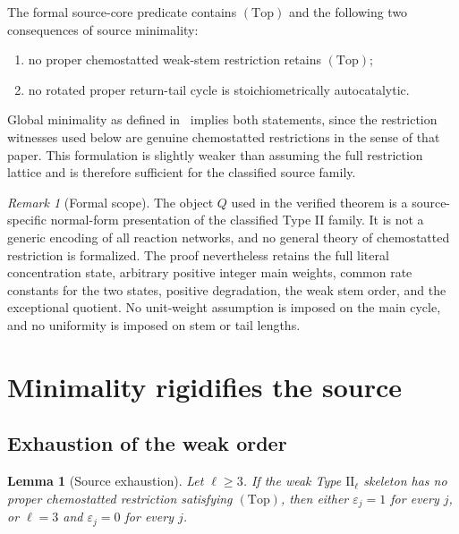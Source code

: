 \documentclass[11pt,reqno]{amsart}
\theoremstyle{plain}
\newtheorem{lemma}[theorem]{Lemma}
\theoremstyle{definition}
\theoremstyle{remark}
\newtheorem{remark}[theorem]{Remark}
\numberwithin{equation}{section}
\newcommand{\Top}{\mathrm{(Top)}}
\begin{document}
The formal source-core predicate contains $\Top$ and the following two consequences of source minimality:
\begin{enumerate}[label=(M\arabic*)]
\item\label{M1} no proper chemostatted weak-stem restriction retains $\Top$;
\item\label{M2} no rotated proper return-tail cycle is stoichiometrically autocatalytic.
\end{enumerate}
Global minimality as defined in~\cite[Definitions~2.3--2.4]{NNU26} implies both statements, since the restriction witnesses used below are genuine chemostatted restrictions in the sense of that paper.  This formulation is slightly weaker than assuming the full restriction lattice and is therefore sufficient for the classified source family.

\begin{remark}[Formal scope]\label{rem:scope}
The object $Q$ used in the verified theorem is a source-specific normal-form presentation of the classified Type II family.  It is not a generic encoding of all reaction networks, and no general theory of chemostatted restriction is formalized.  The proof nevertheless retains the full literal concentration state, arbitrary positive integer main weights, common rate constants for the two states, positive degradation, the weak stem order, and the exceptional quotient.  No unit-weight assumption is imposed on the main cycle, and no uniformity is imposed on stem or tail lengths.
\end{remark}

\section{Minimality rigidifies the source}\label{sec:minimality}

\subsection{Exhaustion of the weak order}

\begin{lemma}[Source exhaustion]\label{lem:exhaustion}
Let $\ell\ge3$.  If the weak Type $\mathrm{II}_\ell$ skeleton has no proper chemostatted restriction satisfying $\Top$, then either $\varepsilon_j=1$ for every $j$, or $\ell=3$ and $\varepsilon_j=0$ for every $j$.
\end{lemma}
\end{document}
